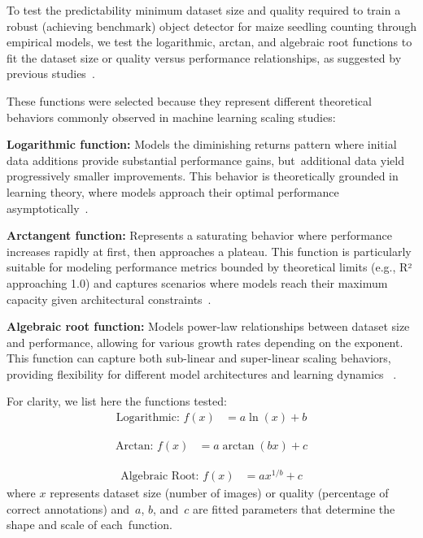 \documentclass[12pt,a4paper,oneside]{report}
\begin{document}
To test the predictability minimum dataset size and quality required to train a robust
(achieving benchmark) object detector for maize seedling counting through empirical 
models, we test the logarithmic, arctan, and algebraic root functions to fit the 
dataset size or quality versus performance relationships, as suggested by previous
studies~\cite{mahmoodHowMuchMore2022}. 

These functions were selected because they represent different theoretical behaviors 
commonly observed in machine learning scaling studies:

\textbf{Logarithmic function:} %
Models the diminishing returns pattern where initial 
data additions provide substantial performance gains, but~additional data yield progressively smaller improvements. This behavior is theoretically grounded in 
learning theory, where models approach their optimal performance asymptotically~\cite{hestnessDeepLearningScaling2017}.

\textbf{Arctangent function:} %
Represents a saturating behavior where performance 
increases rapidly at first, then approaches a plateau. This function is particularly 
suitable for modeling performance metrics bounded by theoretical limits (e.g., R² 
approaching 1.0) and captures scenarios where models reach their maximum capacity 
given architectural constraints~\cite{vianna_analysis_2024}.

\textbf{Algebraic root function:} %
Models power-law relationships between dataset 
size and performance, allowing for various growth rates depending on the exponent. 
This function can capture both sub-linear and super-linear scaling behaviors, 
providing flexibility for different model architectures and learning dynamics
~\cite{hestnessDeepLearningScaling2017}.

For clarity, we list here the functions tested:
\begin{align}
\text{Logarithmic: } f(x) &= a \ln(x) + b
\end{align}

\vspace{-24pt}

\begin{align}
\text{Arctan: } f(x) &= a \arctan(bx) + c
\end{align}

\vspace{-24pt}
\begin{align}
\text{Algebraic Root: } f(x) &= a x^{1/b} + c
\end{align}
where $x$ represents dataset size (number of images) or quality (percentage of 
correct annotations) and~$a$, $b$, and~$c$ are fitted parameters that determine 
the shape and scale of each~function.
\end{document}
